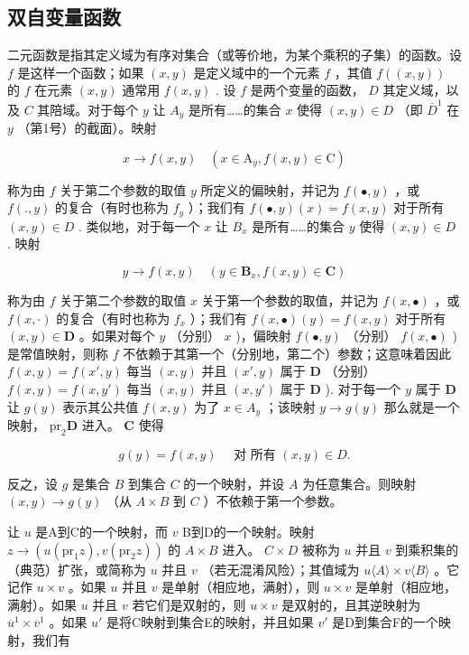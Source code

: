 \subsection{双自变量函数}

二元函数是指其定义域为有序对集合（或等价地，为某个乘积的子集）的函数。设 \(f\) 是这样一个函数；如果 \((x, y)\) 是定义域中的一个元素 \(f\) ，其值 \(f((x, y))\) 的 \(f\) 在元素 \((x, y)\) 通常用 \(f(x, y)\) . 设 \(f\) 是两个变量的函数， \(D\) 其定义域，以及 \(C\) 其陪域。对于每个 \(y\) 让 \(A_y\) 是所有……的集合 \(x\) 使得 \((x, y) \in D\) （即 \(\overline{D}^1\) 在 \(y\) （第1号）的截面）。映射

\[
x \rightarrow f (x, y) \quad (x \in \mathrm{A} _ {y}, f (x, y) \in \mathrm{C})
\]

称为由 \(f\) 关于第二个参数的取值 \(y\) 所定义的偏映射，并记为 \(f(\bullet, y)\) ，或 \(f(., y)\) 的复合（有时也称为 \(f_y\) ）；我们有 \(f(\bullet, y)(x) = f(x, y)\) 对于所有 \((x, y) \in D\) . 类似地，对于每一个 \(x\) 让 \(B_x\) 是所有……的集合 \(y\) 使得 \((x, y) \in D\) . 映射

\[
y \rightarrow f (x, y) \quad (y \in \mathbf {B} _ {x}, f (x, y) \in \mathbf {C})
\]

称为由 \(f\) 关于第二个参数的取值 \(x\) 关于第一个参数的取值，并记为 \(f(x, \bullet)\) ，或 \(f(x, \cdot)\) 的复合（有时也称为 \(f_x\) ）；我们有 \(f(x, \bullet)(y) = f(x, y)\) 对于所有 \((x, y) \in \mathbf{D}\) 。如果对每个 \(y\) （分别） \(x\) )，偏映射 \(f(\bullet, y)\) （分别） \(f(x, \bullet)\) )是常值映射，则称 \(f\) 不依赖于其第一个（分别地，第二个）参数；这意味着因此 \(f(x, y) = f(x', y)\) 每当 \((x, y)\) 并且 \((x', y)\) 属于 \(\mathbf{D}\) （分别） \(f(x, y) = f(x, y')\) 每当 \((x, y)\) 并且 \((x, y')\) 属于 \(\mathbf{D}\) ). 对于每一个 \(y\) 属于 \(\mathbf{D}\) 让 \(g(y)\) 表示其公共值 \(f(x, y)\) 为了 \(x \in A_y\) ；该映射 \(y \to g(y)\) 那么就是一个映射， \(\mathrm{pr}_2\mathbf{D}\) 进入。 \(\mathbf{C}\) 使得

\[
g (y) = f (x, y) \quad \text {   对   所有   } (x, y) \in D.
\]

反之，设 \(g\) 是集合 \(B\) 到集合 \(C\) 的一个映射，并设 \(A\) 为任意集合。则映射 \((x, y) \to g(y)\) （从 \(A \times B\) 到 \(C\) ）不依赖于第一个参数。

让 \(u\) 是A到C的一个映射，而 \(v\) B到D的一个映射。映射 \(z \to (u(\mathrm{pr}_1z), v(\mathrm{pr}_2z))\) 的 \(A \times B\) 进入。 \(C \times D\) 被称为 \(u\) 并且 \(v\) 到乘积集的（典范）扩张，或简称为 \(u\) 并且 \(v\) （若无混淆风险）；其值域为 \(u\langle A\rangle \times v\langle B\rangle\) 。它记作 \(u \times v\) 。如果 \(u\) 并且 \(v\) 是单射（相应地，满射），则 \(u \times v\) 是单射（相应地，满射）。如果 \(u\) 并且 \(v\) 若它们是双射的，则 \(u \times v\) 是双射的，且其逆映射为 \(\overline{u}^1 \times \overline{v}^1\) 。如果 \(u'\) 是将C映射到集合E的映射，并且如果 \(v'\) 是D到集合F的一个映射，我们有

